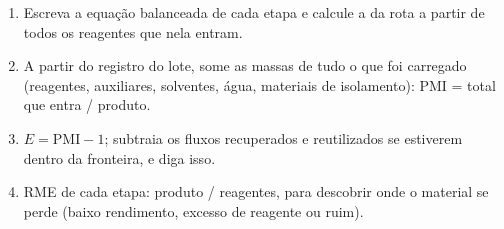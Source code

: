 \begin{method}\label{met:b3:green-industrial:metrics}
\begin{enumerate}
  \item Escreva a equação balanceada de cada etapa e calcule a  da
        rota a partir de todos os reagentes que nela entram.
  \item A partir do registro do lote, some as massas de tudo o que foi carregado (reagentes,
        auxiliares, solventes, água, materiais de isolamento): PMI = total que entra / produto.
  \item $E = \mathrm{PMI} - 1$; subtraia os fluxos recuperados e reutilizados se estiverem dentro da
        fronteira, e diga isso.
  \item RME de cada etapa: produto / reagentes, para descobrir onde o material se perde
        (baixo rendimento, excesso de reagente ou  ruim).
\end{enumerate}
\end{method}

